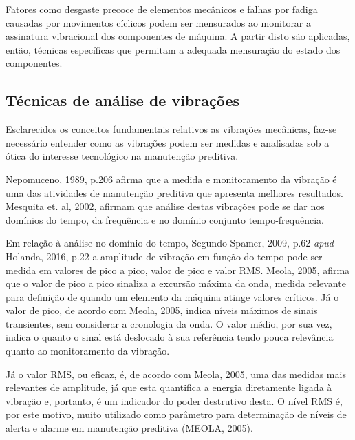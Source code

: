 \documentclass[
	12pt,				
	oneside,			
	a4paper,			
	english,			
	brazil,			
	]{abntex2ppgsi}
\begin{document}
Fatores como desgaste precoce de elementos mecânicos e falhas por fadiga causadas por movimentos cíclicos podem ser mensurados ao monitorar a assinatura vibracional dos componentes de máquina. A partir disto são aplicadas, então, técnicas específicas que permitam a adequada mensuração do estado dos componentes. 


\subsection{\textbf{Técnicas de análise de vibrações}}

Esclarecidos os conceitos  fundamentais relativos as vibrações mecânicas, faz-se necessário entender como as vibrações podem ser medidas e analisadas sob a ótica do interesse tecnológico na manutenção preditiva. 

Nepomuceno, 1989, p.206 afirma que a medida e monitoramento da vibração é uma das atividades de manutenção preditiva que apresenta melhores resultados. Mesquita et. al, 2002, afirmam que análise destas vibrações pode se dar nos domínios do tempo, da frequência e no domínio conjunto tempo-frequência.

Em relação à análise no domínio do tempo, Segundo Spamer, 2009, p.62 \textit{apud} Holanda, 2016, p.22 a amplitude de vibração em função do tempo pode ser medida em valores de pico a pico, valor de pico e valor RMS. Meola, 2005, afirma que o valor de pico a pico sinaliza a excursão máxima da onda, medida relevante para definição de quando um elemento da máquina atinge valores críticos. Já o valor de pico, de acordo com Meola, 2005, indica níveis máximos de sinais transientes, sem considerar a cronologia da onda. O valor médio, por sua vez, indica o quanto o sinal está deslocado à sua referência tendo pouca relevância quanto ao monitoramento da vibração. 


Já o valor RMS, ou eficaz, é, de acordo com Meola, 2005, uma das medidas mais relevantes de amplitude, já que esta quantifica a energia diretamente ligada à vibração e, portanto, é um indicador do poder destrutivo desta. O nível RMS é, por este motivo, muito utilizado como parâmetro para determinação de níveis de alerta e alarme em manutenção preditiva (MEOLA, 2005).

\end{document}
